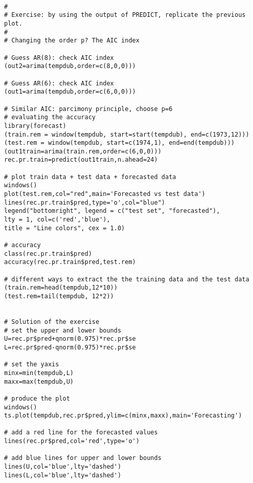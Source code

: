 \begin{example}
    \begin{verbatim}

#
# Exercise: by using the output of PREDICT, replicate the previous plot.
#
# Changing the order p? The AIC index

# Guess AR(8): check AIC index
(out2=arima(tempdub,order=c(8,0,0)))

# Guess AR(6): check AIC index
(out1=arima(tempdub,order=c(6,0,0)))

# Similar AIC: parcimony principle, choose p=6
# evaluating the accuracy
library(forecast)
(train.rem = window(tempdub, start=start(tempdub), end=c(1973,12)))
(test.rem = window(tempdub, start=c(1974,1), end=end(tempdub)))
(out1train=arima(train.rem,order=c(6,0,0)))
rec.pr.train=predict(out1train,n.ahead=24)

# plot train data + test data + forecasted data
windows()
plot(test.rem,col="red",main='Forecasted vs test data')
lines(rec.pr.train$pred,type='o',col="blue")
legend("bottomright", legend = c("test set", "forecasted"),
lty = 1, col=c('red','blue'),
title = "Line colors", cex = 1.0)

# accuracy
class(rec.pr.train$pred)
accuracy(rec.pr.train$pred,test.rem)

# different ways to extract the the training data and the test data
(train.rem=head(tempdub,12*10))
(test.rem=tail(tempdub, 12*2))


# Solution of the exercise
# set the upper and lower bounds
U=rec.pr$pred+qnorm(0.975)*rec.pr$se
L=rec.pr$pred-qnorm(0.975)*rec.pr$se

# set the yaxis
minx=min(tempdub,L)
maxx=max(tempdub,U)

# produce the plot
windows()
ts.plot(tempdub,rec.pr$pred,ylim=c(minx,maxx),main='Forecasting')

# add a red line for the forecasted values
lines(rec.pr$pred,col='red',type='o')

# add blue lines for upper and lower bounds
lines(U,col='blue',lty='dashed')
lines(L,col='blue',lty='dashed')
    \end{verbatim}
\end{example}

